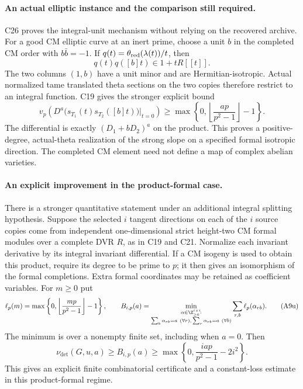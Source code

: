 \paragraph{An actual elliptic instance and the comparison still required.}
C26 proves the integral-unit mechanism without relying on
the recovered archive.  For a good CM elliptic curve at an
inert prime, choose a unit $b$ in the completed CM order with
$b\bar b=-1$.  If $q(t)=\theta_{\rm red}(\lambda(t))/t$, then
\[
                 q(t)q([b]t)\in1+tR[[t]].
 \tag{A9s}
\]
The two columns $(1,b)$ have a unit minor and are
Hermitian-isotropic.  Actual normalized tame translated
theta sections on the two copies therefore restrict to an
integral function.  C19 gives the stronger explicit bound
\[
 v_p\!\left(D^a
    \bigl(s_{T_1}(t)s_{T_2}([b]t)\bigr)\big|_{t=0}\right)
   \geq
   \max\left\{0,\left\lfloor\frac{ap}{p^2-1}\right\rfloor-1\right\}.
 \tag{A9t}
\]
The differential is exactly $(D_1+bD_2)^a$ on the product.
This proves a positive-degree, actual-theta realization of
the strong slope on a specified formal isotropic direction.
The completed CM element need not define a map of complex
abelian varieties.

\paragraph{An explicit improvement in the product-formal case.}
There is a stronger quantitative statement under an additional
integral splitting hypothesis.  Suppose the selected $i$ tangent
directions on each of the $i$ source copies come from independent
one-dimensional strict height-two CM formal modules over a complete
DVR $R$, as in C19 and C21.  Normalize each invariant derivative
by its integral invariant differential.  If a CM isogeny is used
to obtain this product, require its degree to be prime to $p$;
it then gives an isomorphism of the formal completions.  Extra
formal coordinates may be retained as coefficient variables.
For $m\geq0$ put
\[
 \ell_p(m)=\max\left\{0,
          \left\lfloor\frac{mp}{p^2-1}\right\rfloor-1\right\},
 \qquad
 B_{i,p}(a)=
 \min_{\substack{\alpha\in\Z_{\geq0}^{i\times i}\!:\\
               \sum_b\alpha_{rb}=a\ (\forall r),\,
               \sum_r\alpha_{rb}=a\ (\forall b)}}
                   \sum_{r,b}\ell_p(\alpha_{rb}).
 \tag{A9u}
\]
The minimum is over a nonempty finite set, including when
$a=0$.  Then
\[
 \nu_{\det}(G,u,a)\geq B_{i,p}(a)
       \geq\max\left\{0,
                  \frac{iap}{p^2-1}-2i^2\right\}.
 \tag{A9v}
\]
This gives an explicit finite combinatorial certificate and a
constant-loss estimate in this product-formal regime.

